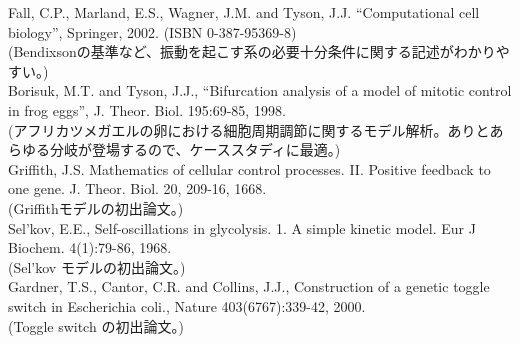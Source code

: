 \noindent Fall, C.P., Marland, E.S., Wagner, J.M. and Tyson, J.J. “Computational cell biology”, Springer, 2002. (ISBN 0-387-95369-8)\\
(Bendixsonの基準など、振動を起こす系の必要十分条件に関する記述がわかりやすい。)\\

\noindent Borisuk, M.T. and Tyson, J.J., “Bifurcation analysis of a model of mitotic control in frog eggs”, J. Theor. Biol. 195:69-85, 1998.\\
(アフリカツメガエルの卵における細胞周期調節に関するモデル解析。ありとあらゆる分岐が登場するので、ケーススタディに最適。)\\

\noindent Griffith, J.S. Mathematics of cellular control processes. II. Positive feedback to one gene. J. Theor. Biol. 20, 209-16, 1668.\\
(Griffithモデルの初出論文。)\\

\noindent Sel'kov, E.E., Self-oscillations in glycolysis. 1. A simple kinetic model. Eur J Biochem. 4(1):79-86, 1968.\\
(Sel'kov モデルの初出論文。)\\

\noindent Gardner, T.S., Cantor, C.R. and Collins, J.J., Construction of a genetic toggle switch in Escherichia coli., Nature 403(6767):339-42, 2000.\\
(Toggle switch の初出論文。)\\


%

